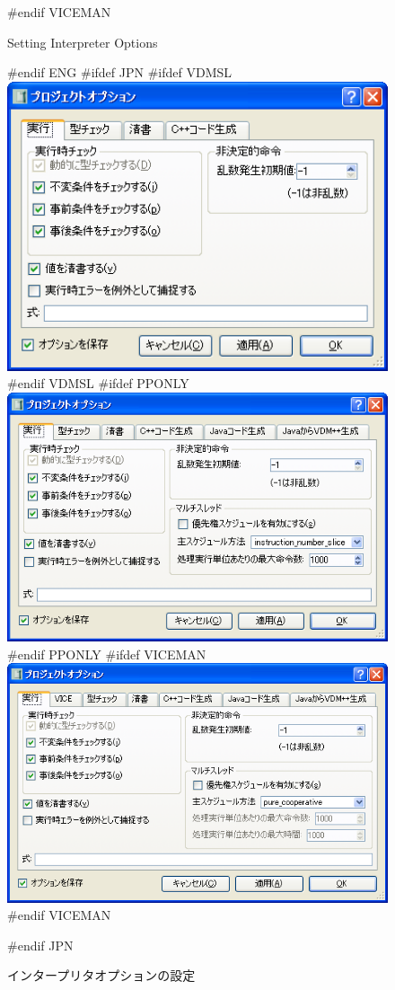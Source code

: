 \documentclass[\pformat,12pt]{article}
\begin{document}
\begin{figure}[tbh]
\begin{center}
#endif VICEMAN
\caption{Setting Interpreter Options}
#endif ENG
#ifdef JPN
#ifdef VDMSL
\includegraphics[width=12.5cm]{interpreterOptions-sl.png}
#endif VDMSL
#ifdef PPONLY
\includegraphics[width=12.5cm]{interpreterOptions-pp.png}
#endif PPONLY
#ifdef VICEMAN
\includegraphics[width=12.5cm]{interpreterOptions-vice.png}
#endif VICEMAN
\caption{インタープリタオプションの設定}
#endif JPN
\label{fig:interoptions}
\end{center}
\end{figure}
\end{document}
